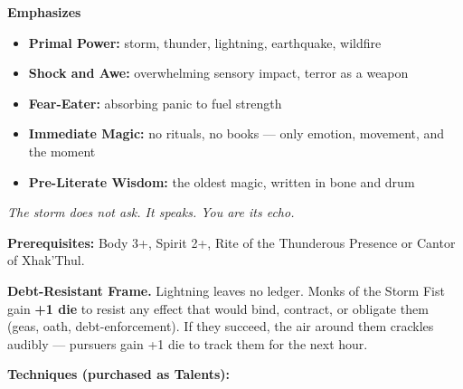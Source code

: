 \noindent\textbf{Emphasizes}
\begin{itemize}
  \item \textbf{Primal Power:} storm, thunder, lightning, earthquake, wildfire
  \item \textbf{Shock and Awe:} overwhelming sensory impact, terror as a weapon
  \item \textbf{Fear-Eater:} absorbing panic to fuel strength
  \item \textbf{Immediate Magic:} no rituals, no books --- only emotion, movement, and the moment
  \item \textbf{Pre-Literate Wisdom:} the oldest magic, written in bone and drum
\end{itemize}

\begin{tcolorbox}[colback=black!5,colframe=cyan!50!black,title=\textbf{Storm Fist (Xhak'Thul)},breakable]
  \emph{The storm does not ask. It speaks. You are its echo.}

  \vspace{2mm}
  \noindent\textbf{Prerequisites:} Body 3+, Spirit 2+, Rite of the Thunderous Presence or Cantor of Xhak'Thul.

  \vspace{2mm}
  \noindent\textbf{Debt-Resistant Frame.} Lightning leaves no ledger. Monks of the Storm Fist gain \textbf{+1 die} to resist any effect that would bind, contract, or obligate them (geas, oath, debt-enforcement). If they succeed, the air around them crackles audibly --- pursuers gain +1 die to track them for the next hour.

  \vspace{2mm}
  \noindent\textbf{Techniques (purchased as Talents):}


\end{tcolorbox}
